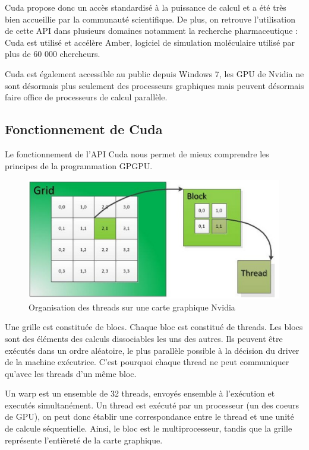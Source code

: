 \documentclass{report}
\begin{document}
Cuda propose donc un accès standardisé à la puissance de calcul et a été très bien accueillie par la communauté scientifique. De plus, on retrouve l'utilisation de cette API dans plusieurs domaines notamment la recherche pharmaceutique : Cuda est utilisé et accélère Amber, logiciel de simulation moléculaire utilisé par plus de 60 000 chercheurs.\newline

Cuda est également accessible au public depuis Windows 7, les GPU de Nvidia ne sont désormais plus seulement des processeurs graphiques mais peuvent désormais faire office de processeurs de calcul parallèle. \newline

\subsection{Fonctionnement de Cuda}

Le fonctionnement de l'API Cuda nous permet de mieux comprendre les principes de la programmation GPGPU. \newline

\begin{figure}[!h]
\begin{center}
\includegraphics[height=150pt]{images_finales/image_cuda.png}
\end{center}
\caption{Organisation des threads sur une carte graphique Nvidia}
\label{test3}
\end{figure}

Une grille est constituée de blocs. Chaque bloc est constitué de threads. Les blocs sont des éléments des calculs dissociables les uns des autres. Ils peuvent être exécutés dans un ordre aléatoire, le plus parallèle possible à la décision du driver de la machine exécutrice. C'est pourquoi chaque thread ne peut communiquer qu'avec les threads d'un même bloc.\newline

Un warp est un ensemble de 32 threads, envoyés ensemble à l'exécution et executés simultanément. Un thread est exécuté par un processeur (un des coeurs de GPU), on peut donc établir une correspondance entre le thread et une unité de calcule séquentielle.\newline
Ainsi, le bloc est le multiprocesseur, tandis que la grille représente l'entièreté de la carte graphique. \newline
\end{document}
